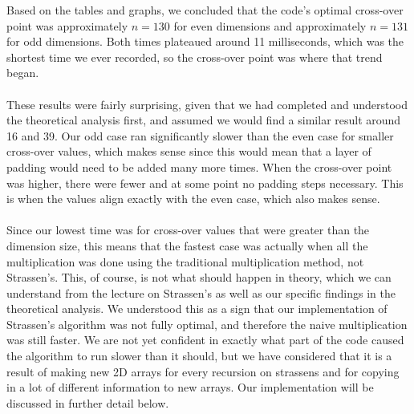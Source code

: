 \documentclass[11pt]{article}
\begin{document}
Based on the tables and graphs, we concluded that the code's optimal cross-over point was approximately $n = 130$ for even dimensions and approximately $n = 131$ for odd dimensions. Both times plateaued around 11 milliseconds, which was the shortest time we ever recorded, so the cross-over point was where that trend began. \\\\
These results were fairly surprising, given that we had completed and understood the theoretical analysis first, and assumed we would find a similar result around 16 and 39. Our odd case ran significantly slower than the even case for smaller cross-over values, which makes sense since this would mean that a layer of padding would need to be added many more times. When the cross-over point was higher, there were fewer and at some point no padding steps necessary. This is when the values align exactly with the even case, which also makes sense. \\\\
Since our lowest time was for cross-over values that were greater than the dimension size, this means that the fastest case was actually when all the multiplication was done using the traditional multiplication method, not Strassen's. This, of course, is not what should happen in theory, which we can understand from the lecture on Strassen's as well as our specific findings in the theoretical analysis. We understood this as a sign that our implementation of Strassen's algorithm was not fully optimal, and therefore the naive multiplication was still faster. We are not yet confident in exactly what part of the code caused the algorithm to run slower than it should, but we have considered that it is a result of making new 2D arrays for every recursion on strassens and for copying in a lot of different information to new arrays. Our implementation will be discussed in further detail below. \\\\
\end{document}

